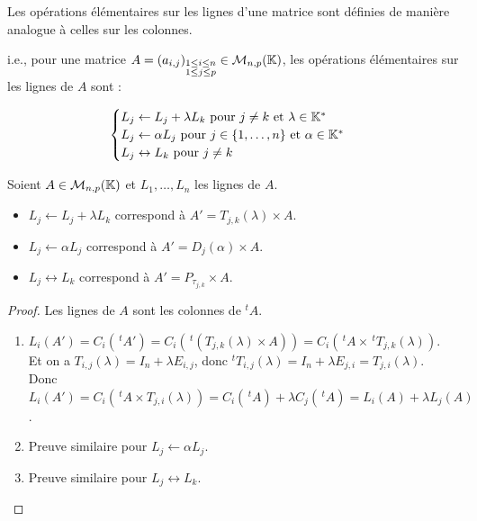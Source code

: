 \documentclass[12pt, a4paper]{report}
\begin{document}
\begin{definition}
    Les opérations élémentaires sur les lignes d'une matrice sont définies de manière analogue à celles sur les colonnes.

    i.e., pour une matrice $A = (a_{i,j})_{\substack{1 \leq i \leq n \\ 1 \leq j \leq p}} \in \mathcal M_{n,p}(\mathbb{K})$, les opérations élémentaires sur les lignes de $A$ sont :

    $$\begin{cases}
        L_j \leftarrow L_j + \lambda L_k \text{ pour } j \ne k \text{ et } \lambda \in \mathbb{K}^* \\
        L_j \leftarrow \alpha L_j \text{ pour } j \in \{1,\dots,n\} \text{ et } \alpha \in \mathbb{K}^* \\
        L_j \leftrightarrow L_k \text{ pour } j \ne k
    \end{cases}$$
\end{definition}

\begin{property}
    Soient $A \in \mathcal M_{n,p}(\mathbb{K})$ et $L_1, \dots, L_n$ les lignes de $A$.
    
    \begin{itemize}
        \item $L_j \leftarrow L_j + \lambda L_k$ correspond à $A' = T_{j,k}(\lambda) \times A$.

        \item $L_j \leftarrow \alpha L_j$ correspond à $A' = D_j(\alpha) \times A$.

        \item $L_j \leftrightarrow L_k$ correspond à $A' = P_{\tau_{j,k}} \times A$.
    \end{itemize}
\end{property}

\begin{proof}
    Les lignes de $A$ sont les colonnes de $^tA$.

    \begin{enumerate}
        \item $L_i(A') = C_i(\,^tA') = C_i(\,^t(T_{j,k}(\lambda) \times A)) = C_i(\,^tA \times \,^tT_{j,k}(\lambda))$.\\Et on a $T_{i,j}(\lambda) = I_n + \lambda E_{i,j}$, donc $^tT_{i,j}(\lambda) = I_n + \lambda E_{j,i} = T_{j,i}(\lambda)$.\\Donc $L_i(A') = C_i(\,^tA \times T_{j,i}(\lambda)) = C_i(\,^tA) + \lambda C_j(\,^tA) = L_i(A) + \lambda L_j(A)$.
        \item Preuve similaire pour $L_j \leftarrow \alpha L_j$.
        \item Preuve similaire pour $L_j \leftrightarrow L_k$.
    \end{enumerate}
\end{proof}
\end{document}
